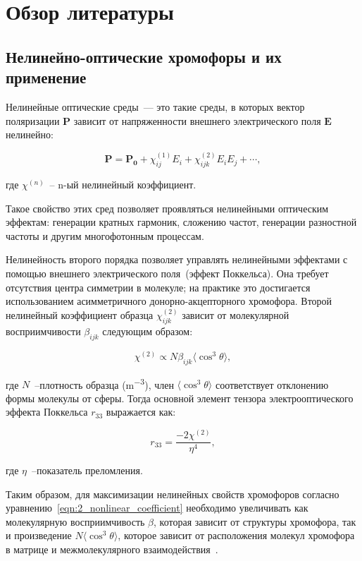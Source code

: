 \section{Обзор литературы}

\subsection{Нелинейно-оптические хромофоры и их применение}

Нелинейные оптические среды~--- это такие среды, в которых вектор поляризации $\mathbf{P}$ зависит от напряженности внешнего электрического поля $\mathbf{E}$ нелинейно:

\begin{equation}
    \mathbf{P} = \mathbf{P_0} + \chi^{(1)}_{ij} E_i + \chi^{(2)}_{ijk} E_i E_j + \cdots ,
\end{equation}

\noindent где $\chi^{(n)}$~-- n-ый нелинейный коэффициент.

Такое свойство этих сред позволяет проявляться нелинейными оптическим эффектам: генерации кратных гармоник, сложению частот, генерации разностной частоты и другим многофотонным процессам.

Нелинейность второго порядка позволяет управлять нелинейными эффектами с помощью внешнего электрического поля~(эффект Поккельса). Она требует отсутствия центра симметрии в молекуле; на практике это достигается использованием асимметричного донорно-акцепторного хромофора. Второй нелинейный коэффициент образца $\chi^{(2)}_{ijk}$ зависит от молекулярной восприимчивости $\beta_{ijk}$ следующим образом:

\begin{equation}
    \chi^{(2)} \propto N \beta_{ijk} \langle\cos^3\theta\rangle,
    \label{eqn:2_nonlinear_coefficient}
\end{equation}

\noindent где $N$~--плотность образца (\si{\metre^{-3}}), член $\langle \cos^3\theta\rangle$ соответствует отклонению формы молекулы от сферы. Тогда основной элемент тензора электрооптического эффекта Поккельса $r_{33}$ выражается как:

\begin{equation}
    r_{33} = \frac{-2\chi^{(2)}}{\eta^4},
\end{equation}

\noindent где $\eta$~--показатель преломления.

Таким образом, для максимизации нелинейных свойств хромофоров согласно уравнению~\ref{eqn:2_nonlinear_coefficient} необходимо увеличивать как молекулярную восприимчивость $\beta$, которая зависит от структуры хромофора, так и произведение $N\langle \cos^3\theta\rangle$, которое зависит от расположения молекул хромофора в матрице и межмолекулярного взаимодействия~\cite{Dalton2010a}. 

